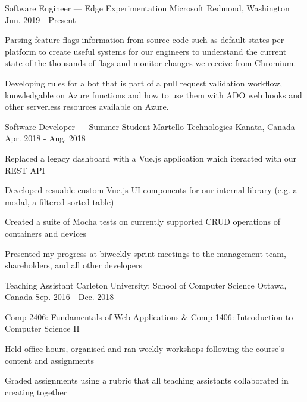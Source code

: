 
\begin{cventries}
	\cventry
		{Software Engineer --- Edge Experimentation}
		{Microsoft}
		{Redmond, Washington}
		{Jun. 2019 - Present}
		{\begin{cvitems}
			\item Parsing feature flags information from source code such as default states per platform to create useful systems for our engineers to understand the current state of the thousands of flags and monitor changes we receive from Chromium.
			\item Developing rules for a bot that is part of a pull request validation workflow, knowledgable on Azure functions and how to use them with ADO web hooks and other serverless resources available on Azure.
		\end{cvitems}}

	\cventry
		{Software Developer --- Summer Student}
		{Martello Technologies}
		{Kanata, Canada}
		{Apr. 2018 - Aug. 2018}
		{\begin{cvitems}
			\item Replaced a legacy dashboard with a Vue.js application which iteracted with our REST API
			\item Developed resuable custom Vue.js UI components for our internal library (e.g. a modal, a filtered sorted table)
			\item Created a suite of Mocha tests on currently supported CRUD operations of containers and devices
			\item Presented my progress at biweekly sprint meetings to the management team, shareholders, and all other developers
		\end{cvitems}}

	\cventry
		{Teaching Assistant}
		{Carleton University: School of Computer Science}
		{Ottawa, Canada}
		{Sep. 2016 - Dec. 2018}
		{\begin{cvitems}
			\item Comp 2406: Fundamentals of Web Applications \& Comp 1406: Introduction to Computer Science II
			\item Held office hours, organised and ran weekly workshops following the course's content and assignments
			\item Graded assignments using a rubric that all teaching assistants collaborated in creating together
		\end{cvitems}}
\end{cventries}